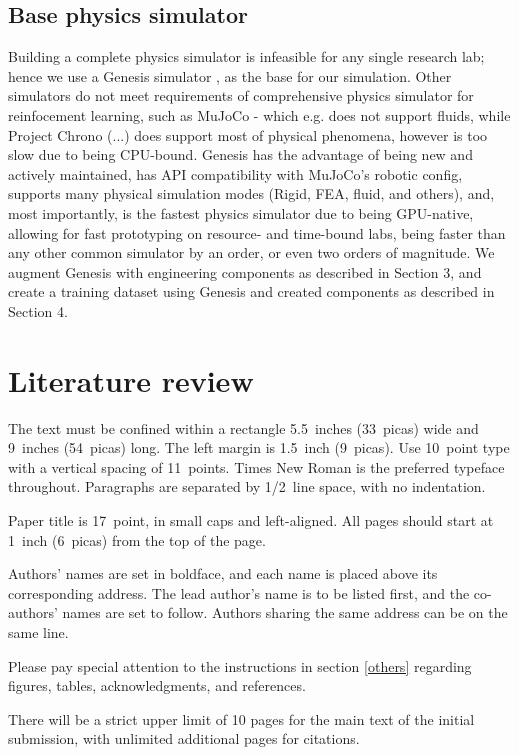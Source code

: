 \documentclass{article} %
\begin{document}
\subsection{Base physics simulator}

Building a complete physics simulator is infeasible for any single research lab; hence we use a Genesis simulator \cite{Genesis Authors, 2025},  as the base for our simulation. Other simulators do not meet requirements of comprehensive physics simulator for reinfocement learning, such as MuJoCo\cite{(Todorov, 2014)}  - which e.g. does not support fluids, while Project Chrono (...) does support most of physical phenomena, however is too slow due to being CPU-bound. Genesis has the advantage of being new and actively maintained, has API compatibility with MuJoCo's robotic config, supports many physical simulation modes (Rigid, FEA, fluid, and others), and, most importantly, is the fastest physics simulator due to being GPU-native, allowing for fast prototyping on resource- and time-bound labs, being faster than any other common simulator by an order, or even two orders of magnitude. We augment Genesis with engineering components as described in Section 3, and create a training dataset using Genesis and created components as described in Section 4.

\section{Literature review}
\label{gen_inst}

The text must be confined within a rectangle 5.5~inches (33~picas) wide and
9~inches (54~picas) long. The left margin is 1.5~inch (9~picas).
Use 10~point type with a vertical spacing of 11~points. Times New Roman is the
preferred typeface throughout. Paragraphs are separated by 1/2~line space,
with no indentation.

Paper title is 17~point, in small caps and left-aligned.
All pages should start at 1~inch (6~picas) from the top of the page.

Authors' names are
set in boldface, and each name is placed above its corresponding
address. The lead author's name is to be listed first, and
the co-authors' names are set to follow. Authors sharing the
same address can be on the same line.

Please pay special attention to the instructions in section \ref{others}
regarding figures, tables, acknowledgments, and references.


There will be a strict upper limit of 10 pages for the main text of the initial submission, with unlimited additional pages for citations. 
\end{document}
